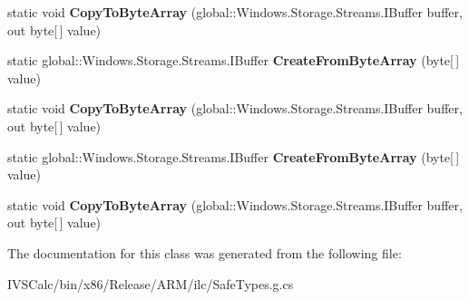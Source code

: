 \begin{DoxyCompactItemize}
static void {\bfseries Copy\+To\+Byte\+Array} (global\+::\+Windows.\+Storage.\+Streams.\+I\+Buffer buffer, out byte\mbox{[}$\,$\mbox{]} value)
\item 
\mbox{\label{class_windows_1_1_security_1_1_cryptography_1_1_cryptographic_buffer_a9b2cc70a831cb99787d82c5485f22336}} 
static global\+::\+Windows.\+Storage.\+Streams.\+I\+Buffer {\bfseries Create\+From\+Byte\+Array} (byte\mbox{[}$\,$\mbox{]} value)
\item 
\mbox{\label{class_windows_1_1_security_1_1_cryptography_1_1_cryptographic_buffer_a7ee39bbf3affcdc23c5f7bff32232eeb}} 
static void {\bfseries Copy\+To\+Byte\+Array} (global\+::\+Windows.\+Storage.\+Streams.\+I\+Buffer buffer, out byte\mbox{[}$\,$\mbox{]} value)
\item 
\mbox{\label{class_windows_1_1_security_1_1_cryptography_1_1_cryptographic_buffer_a9b2cc70a831cb99787d82c5485f22336}} 
static global\+::\+Windows.\+Storage.\+Streams.\+I\+Buffer {\bfseries Create\+From\+Byte\+Array} (byte\mbox{[}$\,$\mbox{]} value)
\item 
\mbox{\label{class_windows_1_1_security_1_1_cryptography_1_1_cryptographic_buffer_a7ee39bbf3affcdc23c5f7bff32232eeb}} 
static void {\bfseries Copy\+To\+Byte\+Array} (global\+::\+Windows.\+Storage.\+Streams.\+I\+Buffer buffer, out byte\mbox{[}$\,$\mbox{]} value)
\end{DoxyCompactItemize}


The documentation for this class was generated from the following file\+:\begin{DoxyCompactItemize}
\item 
I\+V\+S\+Calc/bin/x86/\+Release/\+A\+R\+M/ilc/Safe\+Types.\+g.\+cs\end{DoxyCompactItemize}
